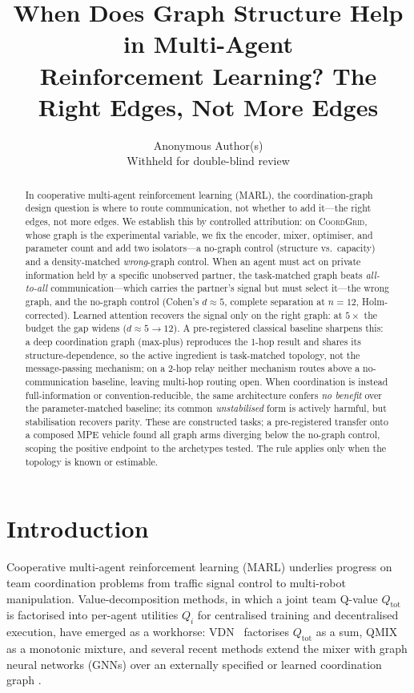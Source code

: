 \documentclass[10pt]{article}
\title{When Does Graph Structure Help in Multi-Agent\\
       Reinforcement Learning? The Right Edges, Not More Edges}
\author{\name Anonymous Author(s) \\
        \addr Withheld for double-blind review}
\newcommand{\algoname}[1]{\textsc{#1}}
\newcommand{\vdn}{\algoname{VDN}}
\newcommand{\qmix}{\algoname{QMIX}}
\newcommand{\coordgrid}{\textsc{CoordGrid}}
\newcommand{\Qtot}{Q_{\mathrm{tot}}}
\newcommand{\Qi}{Q_i}
\begin{document}
\maketitle

\begin{abstract}
In cooperative multi-agent reinforcement learning (MARL), the
coordination-graph design question is where to route communication, not whether
to add it---the right edges, not more edges. We establish this by controlled
attribution: on
\coordgrid, whose graph is the experimental variable, we fix the
encoder, mixer, optimiser, and parameter count and add two isolators---a
no-graph control (structure vs.\ capacity) and a density-matched
\emph{wrong}-graph control. When an agent must act on
private information held by a specific unobserved partner, the task-matched
graph beats \emph{all-to-all} communication---which carries the partner's signal
but must select it---the wrong graph, and the no-graph control (Cohen's
$d\approx5$, complete separation at $n{=}12$, Holm-corrected). Learned attention recovers the signal only on the
right graph: at $5\times$ the budget the gap widens ($d{\approx}5\!\to\!12$). A
pre-registered classical baseline sharpens this: a deep coordination graph
(max-plus) reproduces the 1-hop result and shares its
structure-dependence, so the active ingredient is task-matched topology, not the
message-passing mechanism; on a 2-hop relay neither mechanism routes
above a no-communication baseline, leaving multi-hop routing open. When
coordination is instead full-information or convention-reducible, the same
architecture confers \emph{no benefit} over the parameter-matched baseline; its
common \emph{unstabilised} form is actively harmful, but stabilisation recovers
parity. These are constructed tasks; a pre-registered transfer onto a composed
MPE vehicle found all graph arms diverging below the no-graph control, scoping
the positive endpoint to the archetypes tested. The rule applies only when the
topology is known or estimable.
\end{abstract}

\section{Introduction}
\label{sec:intro}

Cooperative multi-agent reinforcement learning (MARL) underlies progress on
team coordination problems from traffic signal control to multi-robot
manipulation. Value-decomposition methods, in which a joint team Q-value
$\Qtot$ is factorised into per-agent utilities $\Qi$ for centralised
training and decentralised execution, have emerged as a workhorse:
\vdn~\citep{sunehag_2018_vdn} factorises $\Qtot$ as a sum, \qmix
\citep{rashid_2018_qmix,rashid_2020_qmix_jmlr} as a monotonic mixture, and
several recent methods extend the mixer with graph neural networks (GNNs)
over an externally specified or learned coordination graph
\citep{jiang_2020_dgn,liu_2020_g2anet,boehmer_2020_dcg,
       naderializadeh_2020_graphmix}.
\end{document}

